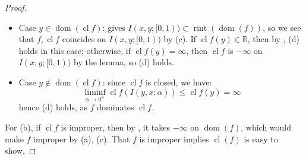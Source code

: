 \begin{proof}
	\begin{itemize}
		\item Case $y\in \operatorname{dom}(\operatorname{cl}f)$:  gives $I(x,y;[0, 1))\subset \operatorname{rint}(\operatorname{dom}(f))$, so we see that $f,\operatorname{cl}f$ coincides on $I(x,y;[0,1))$ by (c). If $\operatorname{cl}f(y)\in \mathbb{R}$, then by , (d) holds in this case; otherwise, if $\operatorname{cl}f(y)=\infty$, then $\operatorname{cl}f$ is $-\infty$ on $I(x,y;[0,1))$ by the lemma, so (d) holds.
		\item Case $y\notin \operatorname{dom}(\operatorname{cl}f)$: since $\operatorname{cl}f$ is closed, we have:
		      \[
			      \underset{\alpha \to 0^+}{\operatorname{liminf}}\operatorname{cl}f(I(y,x;\alpha ))\leq \operatorname{cl}f(y)=\infty
		      \]
		      hence (d) holds, as $f$ dominates $\operatorname{cl}f$.
	\end{itemize}
	For (b), if $\operatorname{cl}f$ is improper, then by , it takes $-\infty$ on $\operatorname{dom}(f)$, which would make $f$ improper by (a), (c). That $f$ is improper implies $\operatorname{cl}(f)$ is easy to show.
\end{proof}



